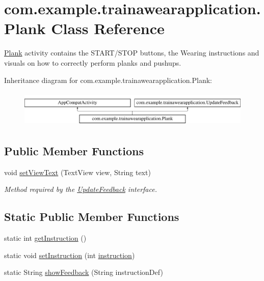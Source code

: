 \hypertarget{classcom_1_1example_1_1trainawearapplication_1_1_plank}{}\section{com.\+example.\+trainawearapplication.\+Plank Class Reference}
\label{classcom_1_1example_1_1trainawearapplication_1_1_plank}


\mbox{\hyperlink{classcom_1_1example_1_1trainawearapplication_1_1_plank}{Plank}} activity contains the S\+T\+A\+R\+T/\+S\+T\+OP buttons, the Wearing instructions and visuals on how to correctly perform planks and pushups.  


Inheritance diagram for com.\+example.\+trainawearapplication.\+Plank\+:\begin{figure}[H]
\begin{center}
\leavevmode
\includegraphics[height=1.766562cm]{classcom_1_1example_1_1trainawearapplication_1_1_plank}
\end{center}
\end{figure}
\subsection*{Public Member Functions}
\begin{DoxyCompactItemize}
\item 
void \mbox{\hyperlink{classcom_1_1example_1_1trainawearapplication_1_1_plank_a4d4a46b71ced8fe89023ccbf14d17f77}{set\+View\+Text}} (Text\+View view, String text)
\begin{DoxyCompactList}\small\item\em Method required by the \mbox{\hyperlink{interfacecom_1_1example_1_1trainawearapplication_1_1_update_feedback}{Update\+Feedback}} interface. \end{DoxyCompactList}\end{DoxyCompactItemize}
\subsection*{Static Public Member Functions}
\begin{DoxyCompactItemize}
\item 
static int \mbox{\hyperlink{classcom_1_1example_1_1trainawearapplication_1_1_plank_a2220e1459dd56fb27948dcddf79bfcfa}{get\+Instruction}} ()
\item 
static void \mbox{\hyperlink{classcom_1_1example_1_1trainawearapplication_1_1_plank_a3cc3d10c2310227ff9fe69e49afac328}{set\+Instruction}} (int \mbox{\hyperlink{classcom_1_1example_1_1trainawearapplication_1_1_plank_a78c9024e55b5817aa05befcff69394c3}{instruction}})
\item 
static String \mbox{\hyperlink{classcom_1_1example_1_1trainawearapplication_1_1_plank_a14343873d9ff489757bebbad97adbaf1}{show\+Feedback}} (String instruction\+Def)
\end{DoxyCompactItemize}
